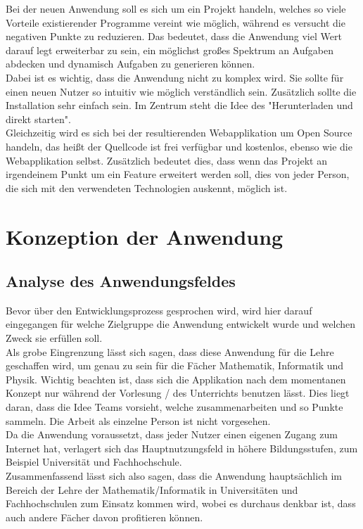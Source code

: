 Bei der neuen Anwendung soll es sich um ein Projekt handeln, welches so viele Vorteile existierender Programme vereint wie möglich, während es versucht die negativen Punkte zu reduzieren. Das bedeutet, dass die Anwendung viel Wert darauf legt erweiterbar zu sein, ein möglichst großes Spektrum an Aufgaben abdecken und dynamisch Aufgaben zu generieren können. \\
Dabei ist es wichtig, dass die Anwendung nicht zu komplex wird. Sie sollte für einen neuen Nutzer so intuitiv wie möglich verständlich sein. Zusätzlich sollte die Installation sehr einfach sein. Im Zentrum steht die Idee des "Herunterladen und direkt starten". \\
Gleichzeitig wird es sich bei der resultierenden Webapplikation um Open Source handeln, das heißt der Quellcode ist frei verfügbar und kostenlos, ebenso wie die Webapplikation selbst. Zusätzlich bedeutet dies, dass wenn das Projekt an irgendeinem Punkt um ein Feature erweitert werden soll, dies von jeder Person, die sich mit den verwendeten Technologien auskennt, möglich ist.

\chapter{Konzeption der Anwendung}

\section{Analyse des Anwendungsfeldes}

Bevor über den Entwicklungsprozess gesprochen wird, wird hier darauf eingegangen für welche Zielgruppe die Anwendung entwickelt wurde und welchen Zweck sie erfüllen soll. \\
Als grobe Eingrenzung lässt sich sagen, dass diese Anwendung für die Lehre geschaffen wird, um genau zu sein für die Fächer Mathematik, Informatik und Physik. Wichtig beachten ist, dass sich die Applikation nach dem momentanen Konzept nur während der Vorlesung / des Unterrichts benutzen lässt. Dies liegt daran, dass die Idee Teams vorsieht, welche zusammenarbeiten und so Punkte sammeln. Die Arbeit als einzelne Person ist nicht vorgesehen. \\
Da die Anwendung voraussetzt, dass jeder Nutzer einen eigenen Zugang zum Internet hat, verlagert sich das Hauptnutzungsfeld in höhere Bildungsstufen, zum Beispiel Universität und Fachhochschule. \\
Zusammenfassend lässt sich also sagen, dass die Anwendung hauptsächlich im Bereich der Lehre der Mathematik/Informatik in Universitäten und Fachhochschulen zum Einsatz kommen wird, wobei es durchaus denkbar ist, dass auch andere Fächer davon profitieren können.

